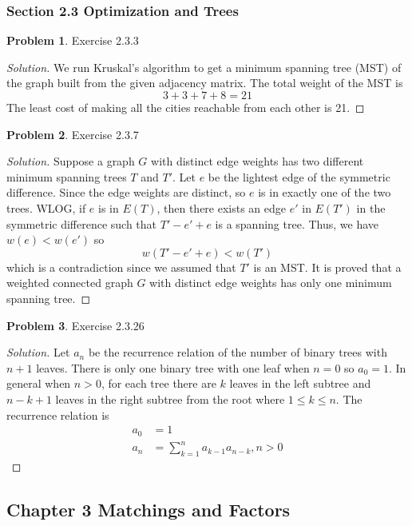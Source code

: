 \documentclass[12pt]{article}
\theoremstyle{definition}
\newtheorem{problem}{Problem}
\newenvironment*{solution}{\begin{proof}[Solution]}{\end{proof}}
\begin{document}
\subsubsection*{Section 2.3 Optimization and Trees}
\begin{problem}
    Exercise 2.3.3
\end{problem}
\begin{solution}
    We run Kruskal's algorithm to get a minimum spanning tree (MST) of the
    graph built from the given adjacency matrix. The total weight of the MST
    is \[3+3+7+8=21\] The least cost of making all the cities reachable from
    each other is 21.
\end{solution}
\begin{problem}
    Exercise 2.3.7
\end{problem}
\begin{solution}
    Suppose a graph \(G\) with distinct edge weights has two different minimum
    spanning trees \(T\) and \(T'\). Let \(e\) be the lightest edge of the
    symmetric difference. Since the edge weights are distinct, so \(e\) is in
    exactly one of the two trees. WLOG, if \(e\) is in \(E(T)\), then there
    exists an edge \(e'\) in \(E(T')\) in the symmetric difference such that
    \(T'-e'+e\) is a spanning tree. Thus, we have \(w(e)<w(e')\) so
    \[w(T'-e'+e) < w(T')\] which is a contradiction since we assumed that
    \(T'\) is an MST. It is proved that a weighted connected graph \(G\) with
    distinct edge weights has only one minimum spanning tree.
\end{solution}
\begin{problem}
    Exercise 2.3.26
\end{problem}
\begin{solution}
    Let \(a_n\) be the recurrence relation of the number of binary trees with
    \(n+1\) leaves. There is only one binary tree with one leaf when \(n=0\)
    so \(a_0=1\). In general when \(n>0\), for each tree there are \(k\)
    leaves in the left subtree and \(n-k+1\) leaves in the right subtree from
    the root where \(1\leq k\leq n\). The recurrence relation is
    \begin{align*}
        a_0 &= 1 \\ a_n &= \sum_{k=1}^n a_{k-1}a_{n-k},n>0
    \end{align*}
\end{solution}

\subsection*{Chapter 3 Matchings and Factors}
\end{document}
